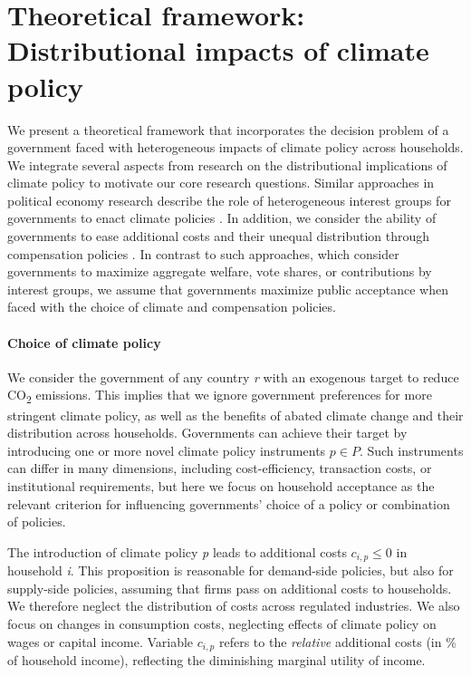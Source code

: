 \documentclass[12pt, a4paper]{article}
\begin{document}
\section{Theoretical framework: Distributional impacts of climate policy} \label{sec:literature}

We present a theoretical framework that incorporates the decision problem of a government faced with heterogeneous impacts of climate policy across households. We integrate several aspects from research on the distributional implications of climate policy to motivate our core research questions. Similar approaches in political economy research describe the role of heterogeneous interest groups for governments to enact climate policies \autocite{Aidt.1998,Fredriksson.1997}. In addition, we consider the ability of governments to ease additional costs and their unequal distribution through compensation policies \autocite{Lindbeck.1987,Aidt.2010,Cremer.2004}. In contrast to such approaches, which consider governments to maximize aggregate welfare, vote shares, or contributions by interest groups, we assume that governments maximize public acceptance \autocite[e.g.,][]{Downs.1957,Stigler.1971} when faced with the choice of climate and compensation policies. 

\paragraph{Choice of climate policy} 
We consider the government of any country \textit{r} with an exogenous target to reduce CO\textsubscript{2} emissions. This implies that we ignore government preferences for more stringent climate policy, as well as the benefits of abated climate change and their distribution across households. Governments can achieve their target by introducing one or more novel climate policy instruments $p \in P$. Such instruments can differ in many dimensions, including cost-efficiency, transaction costs, or institutional requirements, but here we focus on household acceptance as the relevant criterion for influencing governments' choice of a policy or combination of policies.

The introduction of climate policy \textit{p} leads to additional costs $c_{i,p}\leq 0$ in household \textit{i}. This proposition is reasonable for demand-side policies, but also for supply-side policies, assuming that firms pass on additional costs to households. We therefore neglect the distribution of costs across regulated industries. We also focus on changes in consumption costs, neglecting effects of climate policy on wages or capital income. Variable $c_{i,p}$ refers to the \textit{relative} additional costs (in \% of household income), reflecting the diminishing marginal utility of income.
\end{document}
